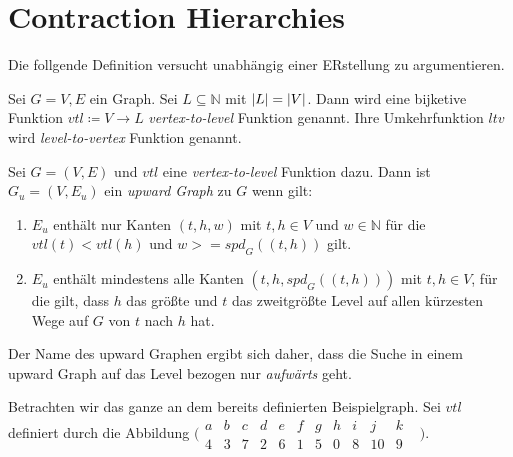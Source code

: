 \chapter{Contraction Hierarchies}\label{chapter:ch}


Die follgende Definition versucht unabhängig einer ERstellung zu argumentieren.

\begin{definition}[Level]
    Sei $G = V, E$ ein Graph.
    Sei $L \subseteq \mathbb{N}$ mit $\abs{L} = \abs{V}$.
    Dann wird eine bijketive Funktion ${vtl} \coloneq V \to L$ \emph{vertex-to-level} Funktion genannt.
    Ihre Umkehrfunktion ${ltv}$ wird \emph{level-to-vertex} Funktion genannt.
\end{definition}

\begin{definition}
    Sei $G = (V, E)$ und ${vtl}$ eine \emph{vertex-to-level} Funktion dazu. Dann ist $G_u = (V, E_u)$ ein \emph{upward Graph} zu $G$ wenn gilt:
    \begin{enumerate}
        \item\label{ch:definition:legal_edges}
        $E_u$ enthält nur Kanten $(t, h, w)$ mit $t, h \in V$ und $w \in \mathbb{N}$ für die ${vtl}(t) < {vtl}(h)$ und $w >= {spd}_{G}((t, h))$ gilt.

        \item\label{ch:definition:upward}
        $E_u$ enthält mindestens alle Kanten $(t, h, {spd}_{G}((t, h)))$ mit $t, h \in V$, für die gilt, dass $h$ das größte und $t$ das zweitgrößte Level auf allen kürzesten Wege auf $G$ von $t$ nach $h$ hat.
    \end{enumerate}
\end{definition}

Der Name des upward Graphen ergibt sich daher, dass die Suche in einem upward Graph auf das Level bezogen nur \emph{aufwärts} geht.

Betrachten wir das ganze an dem bereits definierten Beispielgraph.
Sei ${vtl}$ definiert durch die Abbildung
$\bigl(\begin{smallmatrix}
            a & b & c & d & e & f & g & h & i & j & k & \\
            4 & 3 & 7 & 2 & 6 & 1 & 5 & 0 & 8 & 10 & 9 &
        \end{smallmatrix}\bigr)$.

